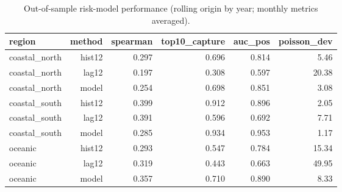 \begin{table}[t]
\centering
\caption{Out-of-sample risk-model performance (rolling origin by year; monthly metrics averaged).}\label{tab:risk}
\small
\begin{tabular}{lrrrrr}
\toprule
region & method & spearman & top10\_capture & auc\_pos & poisson\_dev \\
\midrule
coastal\_north & hist12 & 0.297 & 0.696 & 0.814 & 5.46 \\
coastal\_north & lag12 & 0.197 & 0.308 & 0.597 & 20.38 \\
coastal\_north & model & 0.254 & 0.698 & 0.851 & 3.08 \\
coastal\_south & hist12 & 0.399 & 0.912 & 0.896 & 2.05 \\
coastal\_south & lag12 & 0.391 & 0.596 & 0.692 & 7.71 \\
coastal\_south & model & 0.285 & 0.934 & 0.953 & 1.17 \\
oceanic & hist12 & 0.293 & 0.547 & 0.784 & 15.34 \\
oceanic & lag12 & 0.319 & 0.443 & 0.663 & 49.95 \\
oceanic & model & 0.357 & 0.710 & 0.890 & 8.33 \\
\bottomrule
\end{tabular}
\end{table}